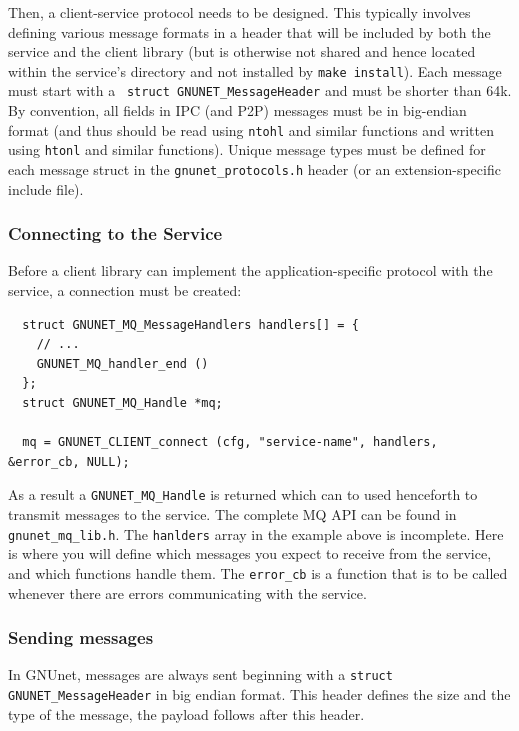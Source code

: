 \documentclass[10pt]{article}
\begin{document}
Then, a client-service protocol needs to be designed.  This typically
involves defining various message formats in a header that will be
included by both the service and the client library (but is otherwise
not shared and hence located within the service's directory and not
installed by {\tt make install}).  Each message must start with a {\tt
  struct GNUNET\_MessageHeader} and must be shorter than 64k.  By
convention, all fields in IPC (and P2P) messages must be in big-endian
format (and thus should be read using {\tt ntohl} and similar
functions and written using {\tt htonl} and similar functions).
Unique message types must be defined for each message struct in the
{\tt gnunet\_protocols.h} header (or an extension-specific include
file).

\subsubsection{Connecting to the Service}

Before a client library can implement the application-specific protocol
with the service, a connection must be created:

\lstset{language=C}
\begin{lstlisting}
  struct GNUNET_MQ_MessageHandlers handlers[] = {
    // ...
    GNUNET_MQ_handler_end ()
  };
  struct GNUNET_MQ_Handle *mq;

  mq = GNUNET_CLIENT_connect (cfg, "service-name", handlers, &error_cb, NULL);
\end{lstlisting}

As a result a {\tt GNUNET\_MQ\_Handle} is returned
which can to used henceforth to transmit messages to
the service.
The complete MQ API can be found in {\tt gnunet\_mq\_lib.h}.
The {\tt hanlders} array in the example above is incomplete.
Here is where you will define which messages you expect to
receive from the service, and which functions handle them.
The {\tt error\_cb} is a function that is to be called whenever
there are errors communicating with the service.

\subsubsection{Sending messages}

In GNUnet, messages are always sent beginning with a {\tt struct GNUNET\_MessageHeader}
in big endian format. This header defines the size and the type of the
message, the payload follows after this header.
\end{document}
